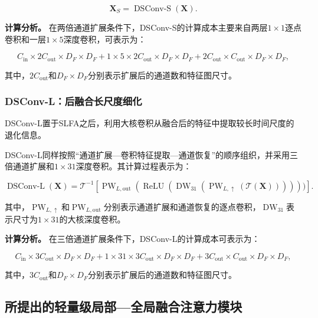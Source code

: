 \begin{equation*}
\mathbf X_S=\operatorname{DSConv\text{-}S}(\mathbf X).
\end{equation*}

\textbf{计算分析。} 在两倍通道扩展条件下，DSConv-S的计算成本主要来自两层$1\times1$逐点卷积和一层$1\times5$深度卷积，可表示为：

\begin{equation*}
C_{\mathrm{in}}\times2C_{\mathrm{out}}\times D_F\times D_F
+1\times5\times2C_{\mathrm{out}}\times D_F\times D_F
+2C_{\mathrm{out}}\times C_{\mathrm{out}}\times D_F\times D_F,
\end{equation*}

其中，$2C_{\mathrm{out}}$和$D_F\times D_F$分别表示扩展后的通道数和特征图尺寸。

\subsubsection{DSConv-L：后融合长尺度细化}

DSConv-L置于SLFA之后，利用大核卷积从融合后的特征中提取较长时间尺度的退化信息。

DSConv-L同样按照“通道扩展—卷积特征提取—通道恢复”的顺序组织，并采用三倍通道扩展和$1\times31$深度卷积。其计算过程表示为：

\begin{equation}
\operatorname{DSConv\text{-}L}(\mathbf X)
=
\mathcal T^{-1}
[ 
\operatorname{PW}_{L,\mathrm{out}}
(
\operatorname{ReLU}
(
\operatorname{DW}_{31}
(
\operatorname{PW}_{L,\uparrow}
(
\mathcal T(\mathbf X)
)
)
)
)
)].
\label{eq:dsconv_l}
\end{equation}

其中，$\operatorname{PW}_{L,\uparrow}$和$\operatorname{PW}_{L,\mathrm{out}}$分别表示通道扩展和通道恢复的逐点卷积，$\operatorname{DW}_{31}$表示尺寸为$1\times31$的大核深度卷积。

\textbf{计算分析。} 在三倍通道扩展条件下，DSConv-L的计算成本可表示为：

\begin{equation*}
C_{\mathrm{in}}\times3C_{\mathrm{out}}\times D_F\times D_F
+1\times31\times3C_{\mathrm{out}}\times D_F\times D_F
+3C_{\mathrm{out}}\times C_{\mathrm{out}}\times D_F\times D_F,
\end{equation*}

其中，$3C_{\mathrm{out}}$和$D_F\times D_F$分别表示扩展后的通道数和特征图尺寸。

\subsection{所提出的轻量级局部—全局融合注意力模块}

